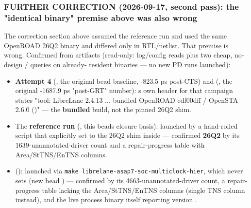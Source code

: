 \subsubsection{FURTHER CORRECTION (2026-09-17, second pass): the
"identical binary" premise above was also wrong}\label{cr:run:phase5:further-correction-2026-09-17-second-pass-the-identical-binary-premise-above-was-also-wrong}

\begin{record}

The correction section above assumed the reference run and
 used the same OpenROAD 26Q2 binary and differed only in
RTL/\allowbreak{}netlist. That premise is wrong. Confirmed from
artifacts (read-only: log/\allowbreak{}config reads plus two cheap,
no-design / queries on already- resident
binaries --- no new PD runs launched):

\begin{itemize}
\tightlist
\item
  \textbf{Attempt 4} (, the original bead
   baseline, -823.5 ps post-CTS) and \textbf{}
  (, the original -1687.9 ps "post-GRT"
  number): \textquotesingle s own header for
  that campaign states "tool: LibreLane 2.4.13 ... bundled OpenROAD
  edf00dff / OpenSTA 2.6.0 ()" --- the
  \textbf{bundled}  build, not the pinned 26Q2 shim.
\item
  The \textbf{reference run} (, this
  bead\textquotesingle s closure basis): launched by a hand-rolled
  script that explicitly set  to the 26Q2 shim inside
   --- confirmed \textbf{26Q2} by its
  1639-unannotated-driver count and a repair-progress table with
  Area/\allowbreak{}StTNS/\allowbreak{}EnTNS columns.
\item
  \textbf{} (): launched via
  \texttt{make\ librelane-\allowbreak{}asap7-\allowbreak{}soc-\allowbreak{}multiclock-\allowbreak{}hier},
  which never sets  (new bead ) ---
  confirmed \textbf{} by its 4663-unannotated-driver
  count, a repair-progress table lacking the
  Area/\allowbreak{}StTNS/\allowbreak{}EnTNS columns (single TNS column
  instead), and the live process binary itself reporting version
  .
\end{itemize}


\end{record}
